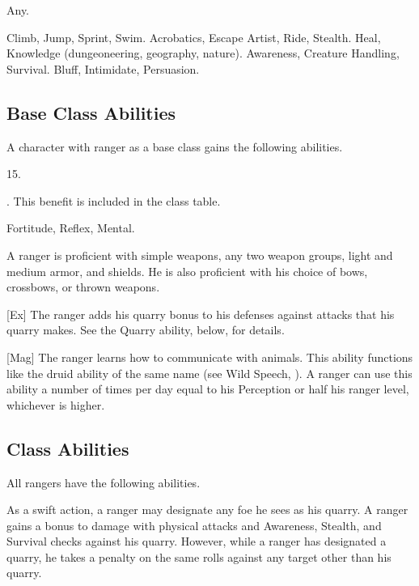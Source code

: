      Any.

     Climb, Jump, Sprint, Swim.
     Acrobatics, Escape Artist, Ride, Stealth.
     Heal, Knowledge (dungeoneering, geography, nature).
     Awareness, Creature Handling, Survival.
     Bluff, Intimidate, Persuasion.

    \subsection{Base Class Abilities}
        A character with ranger as a base class gains the following abilities.

         15.

         . This benefit is included in the class table.

          Fortitude,  Reflex,  Mental.

        A ranger is proficient with simple weapons, any two weapon groups, light and medium armor, and shields.
        He is also proficient with his choice of bows, crossbows, or thrown weapons.

        [Ex]
        The ranger adds his quarry bonus to his defenses against attacks that his quarry makes.
        See the Quarry ability, below, for details.

        [Mag]
        The ranger learns how to communicate with animals.
        This ability functions like the druid ability of the same name (see Wild Speech, ).
        A ranger can use this ability a number of times per day equal to his Perception or half his ranger level, whichever is higher.

    \subsection{Class Abilities}
        All rangers have the following abilities.

        As a swift action, a ranger may designate any foe he sees as his quarry.
        A ranger gains a  bonus to damage with physical attacks and Awareness, Stealth, and Survival checks against his quarry.
        However, while a ranger has designated a quarry, he takes a  penalty on the same rolls against any target other than his quarry.

